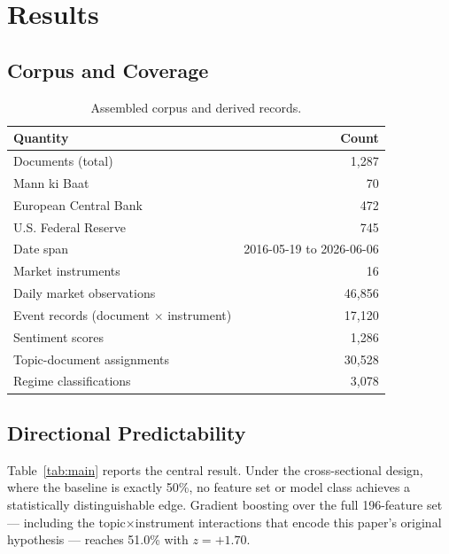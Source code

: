 \documentclass[11pt]{article}
\begin{document}
\section{Results}
\label{sec:results}

\subsection{Corpus and Coverage}

\begin{table}[H]
\centering
\caption{Assembled corpus and derived records.}
\label{tab:corpus}
\begin{tabular}{lr}
\toprule
\textbf{Quantity} & \textbf{Count} \\
\midrule
Documents (total) & 1{,}287 \\
\quad Mann ki Baat & 70 \\
\quad European Central Bank & 472 \\
\quad U.S. Federal Reserve & 745 \\
Date span & 2016-05-19 to 2026-06-06 \\
Market instruments & 16 \\
Daily market observations & 46{,}856 \\
Event records (document $\times$ instrument) & 17{,}120 \\
Sentiment scores & 1{,}286 \\
Topic-document assignments & 30{,}528 \\
Regime classifications & 3{,}078 \\
\bottomrule
\end{tabular}
\end{table}

\subsection{Directional Predictability}

Table~\ref{tab:main} reports the central result. Under the cross-sectional design, where the baseline is exactly 50\%, no feature set or model class achieves a statistically distinguishable edge. Gradient boosting over the full 196-feature set --- including the topic$\times$instrument interactions that encode this paper's original hypothesis --- reaches 51.0\% with $z = +1.70$.
\end{document}
